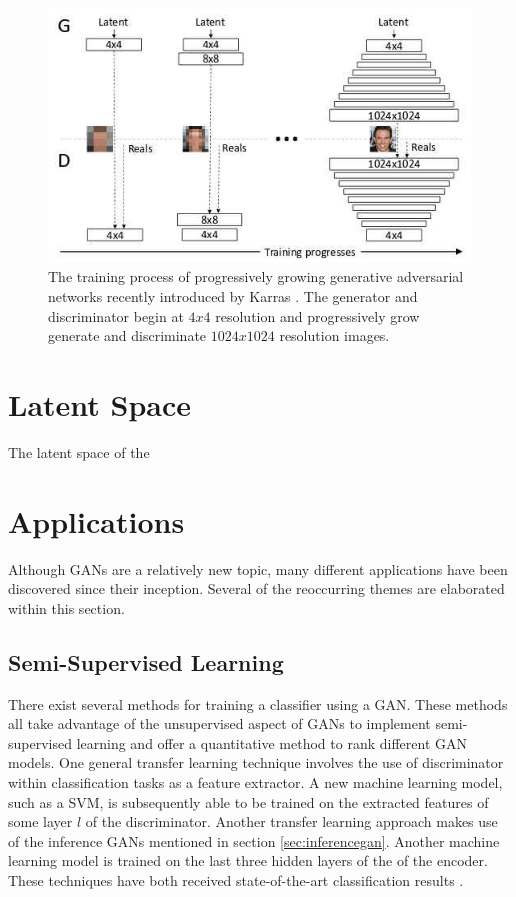 \documentclass[11pt]{article}
\begin{document}
\begin{figure}
\centering
\includegraphics[scale=0.45]{progressive_growing}
\caption{The training process of progressively growing generative adversarial networks recently introduced by Karras  \citep{2017arXiv171010196K}. The generator and discriminator begin at $4x4$ resolution and progressively grow generate and discriminate $1024x1024$ resolution images.}
\label{fig:ProgressiveGrowingGAN}
\end{figure}

\section{Latent Space}
The latent space of the

\section{Applications}
Although GANs are a relatively new topic, many different applications have been discovered since their inception. Several of the reoccurring themes are elaborated within this section.

\subsection{Semi-Supervised Learning} \label{sec:semisupervised}
There exist several methods for training a classifier using a GAN. These methods all take advantage of the unsupervised aspect of GANs to implement semi-supervised learning and offer a quantitative method to rank different GAN models. One general transfer learning technique involves the use of discriminator within classification tasks as a feature extractor. A new machine learning model, such as a SVM, is subsequently able to be trained on the extracted features of some layer $l$ of the discriminator. Another transfer learning approach makes use of the inference GANs mentioned in section \ref{sec:inferencegan}. Another machine learning model is trained on the last three hidden layers of the of the encoder. These techniques have both received state-of-the-art classification results \citep{2017arXiv171007035C}.
\end{document}

